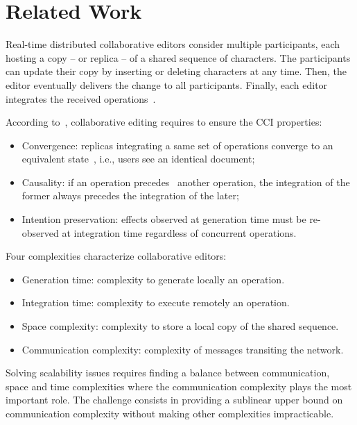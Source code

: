 \section{Related Work}
\label{sec:relatedwork}

Real-time distributed collaborative editors consider multiple participants, each
hosting a copy -- or replica -- of a shared sequence of characters. The
participants can update their copy by inserting or deleting characters at any
time. Then, the editor eventually delivers the change to all
participants. Finally, each editor integrates the received
operations~\cite{saito2005optimistic}.

\noindent According to~\cite{sun1998achieving}, collaborative editing requires
to ensure the CCI properties:
\begin{itemize}
\item Convergence: replicas integrating a same set of operations converge to an
  equivalent state~\cite{bailis2013eventual, shapiro2011conflict}, i.e., users
  see an identical document;
\item Causality: if an operation precedes~\cite{lamport1978time} another
  operation, the integration of the former always precedes the integration of
  the later;
\item Intention preservation: effects observed at generation time must be
  re-observed at integration time regardless of concurrent operations. 
\end{itemize}

\noindent Four complexities characterize collaborative editors:
\begin{itemize}
\item Generation time: complexity to generate locally an operation.
\item Integration time: complexity to execute remotely an operation.
\item Space complexity: complexity to store a local copy of the shared sequence.
\item Communication complexity: complexity of messages transiting the network.
\end{itemize}
Solving scalability issues requires finding a balance between communication,
space and time complexities where the communication complexity plays the most
important role. The challenge consists in providing a sublinear upper bound on
communication complexity without making other complexities impracticable.


